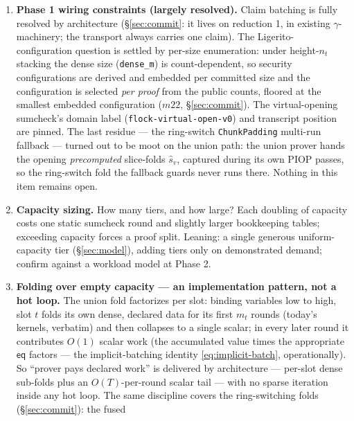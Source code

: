 \documentclass[11pt]{article}
\newcommand{\eq}{\mathsf{eq}}
\newcommand{\code}[1]{\texttt{#1}}
\theoremstyle{definition}
\begin{document}
\begin{enumerate}[nosep]
  \item \textbf{Phase 1 wiring constraints (largely resolved).} Claim
        batching is fully resolved by architecture (\S\ref{sec:commit}:
        it lives on reduction 1, in existing $\gamma$-machinery; the
        transport always carries one claim). The Ligerito-configuration
        question is settled by per-size enumeration: under height-$n_t$
        stacking the dense size (\code{dense\_m}) is count-dependent, so
        security configurations are derived and embedded per committed
        size and the configuration is selected \emph{per proof} from the
        public counts, floored at the smallest embedded configuration
        ($m22$, \S\ref{sec:commit}). The virtual-opening
        sumcheck's domain label (\code{flock-virtual-open-v0}) and
        transcript position are pinned. The last residue --- the
        ring-switch \code{ChunkPadding} multi-run fallback --- turned
        out to be moot on the union path: the union prover hands the
        opening \emph{precomputed} slice-folds $\hat s_v$, captured
        during its own PIOP passes, so the ring-switch fold the
        fallback guards never runs there. Nothing in this item remains
        open.
  \item \textbf{Capacity sizing.} How many tiers, and how large? Each
        doubling of capacity costs one static sumcheck round and slightly
        larger bookkeeping tables; exceeding capacity forces a proof
        split. Leaning: a single generous uniform-capacity tier
        (\S\ref{sec:model}), adding tiers only on demonstrated demand;
        confirm against a workload model at Phase 2.
  \item \label{item:folding}\textbf{Folding over empty capacity --- an
        implementation
        pattern, not a hot loop.} The union fold factorizes per slot:
        binding variables low to high, slot $t$ folds its own dense,
        declared data for its first $m_t$ rounds (today's kernels,
        verbatim) and then collapses to a single scalar; in every later
        round it contributes $O(1)$ scalar work (the accumulated value
        times the appropriate $\eq$ factors --- the implicit-batching
        identity \eqref{eq:implicit-batch}, operationally). So ``prover
        pays declared work'' is delivered by architecture --- per-slot
        dense sub-folds plus an $O(T)$-per-round scalar tail --- with no
        sparse iteration inside any hot loop. The same discipline covers
        the ring-switching folds (\S\ref{sec:commit}): the fused

\end{enumerate}
\end{document}
